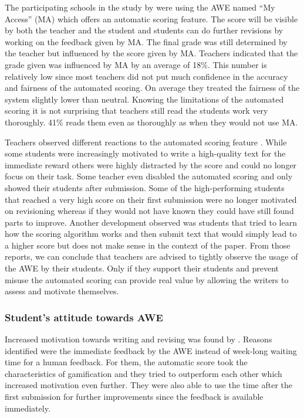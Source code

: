 \documentclass[runningheads]{llncs}
\begin{document}
The participating schools in the study by \textcite{grimes_utility_2010} were using the AWE named ``My Access'' (MA) which offers an automatic scoring feature. The score will be visible by both the teacher and the student and students can do further revisions by working on the feedback given by MA. The final grade was still determined by the teacher but influenced by the score given by MA. Teachers indicated that the grade given was influenced by MA by an average of 18\%. This number is relatively low since most teachers did not put much confidence in the accuracy and fairness of the automated scoring. On average they treated the fairness of the system slightly lower than neutral. Knowing the limitations of the automated scoring it is not surprising that teachers still read the students work very thoroughly. 41\% reads them even as thoroughly as when they would not use MA. 

Teachers observed different reactions to the automated scoring feature \citep{grimes_utility_2010}. While some students were increasingly motivated to write a high-quality text for the immediate reward others were highly distracted by the score and could no longer focus on their task. Some teacher even disabled the automated scoring and only showed their students after submission. Some of the high-performing students that reached a very high score on their first submission were no longer motivated on revisioning whereas if they would not have known they could have still found parts to improve. Another development observed was students that tried to learn how the scoring algorithm works and then submit text that would simply lead to a higher score but does not make sense in the context of the paper. From those reports, we can conclude that teachers are advised to tightly observe the usage of the AWE by their students. Only if they support their students and prevent misuse the automated scoring can provide real value by allowing the writers to assess and motivate themselves.

\subsubsection{Student's attitude towards AWE}
Increased motivation towards writing and revising was found by \textcite{grimes_utility_2010}. Reasons identified were the immediate feedback by the AWE instead of week-long waiting time for a human feedback. For them, the automatic score took the characteristics of gamification and they tried to outperform each other which increased motivation even further. They were also able to use the time after the first submission for further improvements since the feedback is available immediately.
\end{document}
